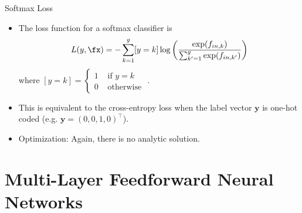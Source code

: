 \begin{frame} {Softmax Loss}
  \begin{itemize}
\vspace{5mm}
\item The loss function for a softmax classifier is
$$L(y, \fx) = - \sum_{k = 1}^g [y = k] \log \left( \frac{\exp(f_{in,k})}{\sum_{k'=1}^g\exp(f_{in,k'})}\right)$$
where $[y = k] = \begin{cases} 1 & \text{ if } y = k \\
0 & \text{ otherwise }
\end{cases}$. 
\vspace{5mm}
\item This is equivalent to the cross-entropy loss when the label vector $\bm{y}$ is one-hot coded (e.g. $\mathbf{y} = (0,0,1,0)^\top$). 
\item Optimization:  Again, there is no analytic solution.
\end{itemize}
\end{frame}


\section{Multi-Layer Feedforward Neural Networks}

